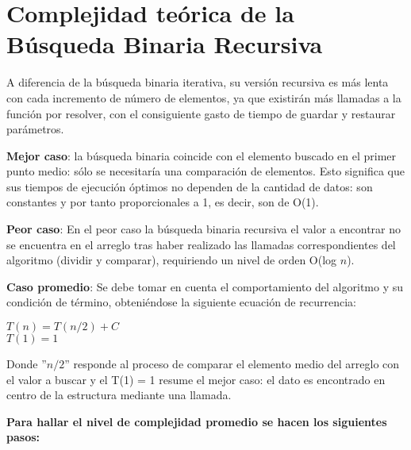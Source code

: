 
\section{Complejidad teórica de la Búsqueda Binaria Recursiva}

A diferencia de la búsqueda binaria iterativa, su versión recursiva es más lenta con cada incremento de número de elementos, ya que existirán más llamadas a la función por resolver, con el consiguiente gasto de tiempo de guardar y restaurar parámetros.

\textbf{Mejor caso}: la búsqueda binaria coincide con el elemento buscado en el primer punto medio: sólo se necesitaría una comparación de elementos. Esto significa que sus tiempos de ejecución óptimos no dependen de la cantidad de datos: son constantes y por tanto proporcionales a 1, es decir, son de O(1).

\textbf{Peor caso}: En el peor caso la búsqueda binaria recursiva el valor a encontrar no se encuentra en el arreglo tras haber realizado las llamadas correspondientes del algoritmo (dividir y comparar), requiriendo un nivel de orden O(log $n$).

\textbf{Caso promedio}: Se debe tomar en cuenta el comportamiento del algoritmo y su condición de término, obteniéndose la siguiente ecuación de recurrencia:

\begin{center}
$T(n) = T(n/2) + C$\\
$T(1) = 1$
\end{center}

Donde ''$n/2$'' responde al proceso de comparar el elemento medio del arreglo con el valor a buscar y el T(1) = 1 resume el mejor caso: el dato es encontrado en centro de la estructura mediante una llamada.

\textbf{Para hallar el nivel de complejidad promedio se hacen los siguientes pasos:}

